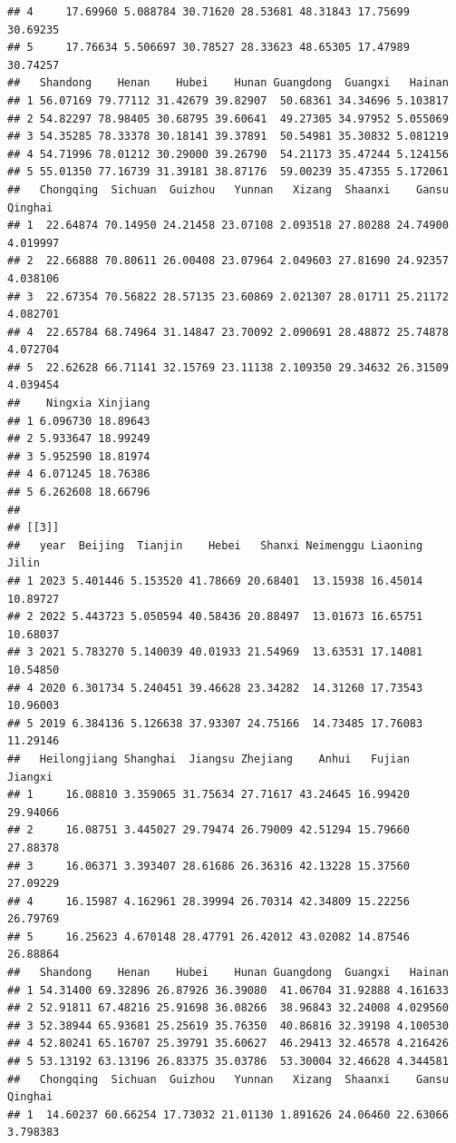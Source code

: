 \documentclass[]{article}
\begin{document}
\begin{verbatim}
## 4     17.69960 5.088784 30.71620 28.53681 48.31843 17.75699 30.69235
## 5     17.76634 5.506697 30.78527 28.33623 48.65305 17.47989 30.74257
##   Shandong    Henan    Hubei    Hunan Guangdong  Guangxi   Hainan
## 1 56.07169 79.77112 31.42679 39.82907  50.68361 34.34696 5.103817
## 2 54.82297 78.98405 30.68795 39.60641  49.27305 34.97952 5.055069
## 3 54.35285 78.33378 30.18141 39.37891  50.54981 35.30832 5.081219
## 4 54.71996 78.01212 30.29000 39.26790  54.21173 35.47244 5.124156
## 5 55.01350 77.16739 31.39181 38.87176  59.00239 35.47355 5.172061
##   Chongqing  Sichuan  Guizhou   Yunnan   Xizang  Shaanxi    Gansu  Qinghai
## 1  22.64874 70.14950 24.21458 23.07108 2.093518 27.80288 24.74900 4.019997
## 2  22.66888 70.80611 26.00408 23.07964 2.049603 27.81690 24.92357 4.038106
## 3  22.67354 70.56822 28.57135 23.60869 2.021307 28.01711 25.21172 4.082701
## 4  22.65784 68.74964 31.14847 23.70092 2.090691 28.48872 25.74878 4.072704
## 5  22.62628 66.71141 32.15769 23.11138 2.109350 29.34632 26.31509 4.039454
##    Ningxia Xinjiang
## 1 6.096730 18.89643
## 2 5.933647 18.99249
## 3 5.952590 18.81974
## 4 6.071245 18.76386
## 5 6.262608 18.66796
## 
## [[3]]
##   year  Beijing  Tianjin    Hebei   Shanxi Neimenggu Liaoning    Jilin
## 1 2023 5.401446 5.153520 41.78669 20.68401  13.15938 16.45014 10.89727
## 2 2022 5.443723 5.050594 40.58436 20.88497  13.01673 16.65751 10.68037
## 3 2021 5.783270 5.140039 40.01933 21.54969  13.63531 17.14081 10.54850
## 4 2020 6.301734 5.240451 39.46628 23.34282  14.31260 17.73543 10.96003
## 5 2019 6.384136 5.126638 37.93307 24.75166  14.73485 17.76083 11.29146
##   Heilongjiang Shanghai  Jiangsu Zhejiang    Anhui   Fujian  Jiangxi
## 1     16.08810 3.359065 31.75634 27.71617 43.24645 16.99420 29.94066
## 2     16.08751 3.445027 29.79474 26.79009 42.51294 15.79660 27.88378
## 3     16.06371 3.393407 28.61686 26.36316 42.13228 15.37560 27.09229
## 4     16.15987 4.162961 28.39994 26.70314 42.34809 15.22256 26.79769
## 5     16.25623 4.670148 28.47791 26.42012 43.02082 14.87546 26.88864
##   Shandong    Henan    Hubei    Hunan Guangdong  Guangxi   Hainan
## 1 54.31400 69.32896 26.87926 36.39080  41.06704 31.92888 4.161633
## 2 52.91811 67.48216 25.91698 36.08266  38.96843 32.24008 4.029560
## 3 52.38944 65.93681 25.25619 35.76350  40.86816 32.39198 4.100530
## 4 52.80241 65.16707 25.39791 35.60627  46.29413 32.46578 4.216426
## 5 53.13192 63.13196 26.83375 35.03786  53.30004 32.46628 4.344581
##   Chongqing  Sichuan  Guizhou   Yunnan   Xizang  Shaanxi    Gansu  Qinghai
## 1  14.60237 60.66254 17.73032 21.01130 1.891626 24.06460 22.63066 3.798383

\end{verbatim}
\end{document}
